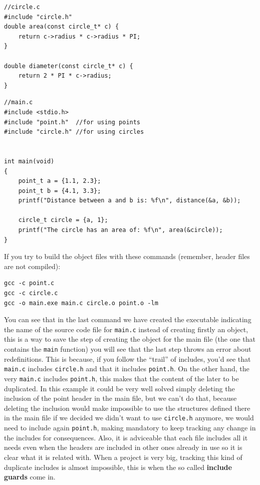 \documentclass[a4paper]{article}
\begin{document}
\noindent
\begin{minipage}[H]{\linewidth}
\mbox{}
\begin{lstlisting}[style=C,
caption={Redefinition example -- \texttt{circle.c}},
label={lst:redefInclude}]
//circle.c
#include "circle.h"
double area(const circle_t* c) {
    return c->radius * c->radius * PI;
}

double diameter(const circle_t* c) {
    return 2 * PI * c->radius;
}
\end{lstlisting}
\end{minipage}

\noindent
\begin{minipage}[H]{\linewidth}
\mbox{}
\begin{lstlisting}[style=C,
caption={Redefinition example -- \texttt{main.c}},
label={lst:redefInclude}]
//main.c
#include <stdio.h>
#include "point.h"  //for using points
#include "circle.h" //for using circles


int main(void)
{
    point_t a = {1.1, 2.3};
    point_t b = {4.1, 3.3};
    printf("Distance between a and b is: %f\n", distance(&a, &b));

    circle_t circle = {a, 1};
    printf("The circle has an area of: %f\n", area(&circle));
}
\end{lstlisting}
\end{minipage}

If you try to build the object files with these commands (remember, header
files are not compiled):

\noindent
\begin{minipage}[H]{\linewidth}
\mbox{}
\begin{lstlisting}[style=terminalStyle]
gcc -c point.c
gcc -c circle.c
gcc -o main.exe main.c circle.o point.o -lm
\end{lstlisting}
\end{minipage}

You can see that in the last command we have created the executable indicating
the name of the source code file for \verb!main.c! instead of creating firstly
an object, this is a way to save the step of creating the object for the main
file (the one that contains the \verb!main! function) you will see that the last
step throws an error about redefinitions. This is because, if you follow the
``trail'' of includes, you'd see that \verb!main.c! includes \verb!circle.h! and
that it includes \verb!point.h!. On the other hand, the very \verb!main.c!
includes \verb!point.h!, this makes that the content of the later to be
duplicated. In this example it could be very well solved simply deleting the
inclusion of the point header in the main file, but we can't do that, because
deleting the inclusion would make impossible to use the structures defined there
in the main file if we decided we didn't want to use \verb!circle.h! anymore,
we would need to include again \verb!point.h!, making mandatory to
keep tracking any change in the includes for consequences. Also, it is
adviceable that each file includes all it needs even when the headers are
included in other ones already in use so it is clear what it is related with.
When a project is very big, tracking this kind of duplicate includes is almost
impossible, this is when the so called \textbf{include guards} come in.
\end{document}
